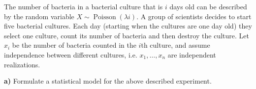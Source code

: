 \documentclass{article}
\begin{document}
\begin{sproblem}
The number of bacteria in a bacterial culture that is \(i\) days old can be
described by the random variable \(X \sim \operatorname{Poisson}(\lambda i)\).
A group of scientists decides to start five bacterial cultures. Each day
(starting when the cultures are one day old) they select one culture, count its
number of bacteria and then destroy the culture. Let \(x_i\) be the number of
bacteria counted in the \(i\)th culture, and assume independence between
different cultures, i.e. \(x_1, \ldots , x_n\) are independent realizations.
\end{sproblem}

\begin{ssubproblem}
\textbf{a)} Formulate a statistical model for the above described experiment.
\end{ssubproblem}
\end{document}
